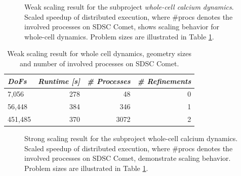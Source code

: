 \begin{figure}[H]
\centering
{}
\caption{Weak scaling result for the subproject \emph{whole-cell calcium dynamics}. 
Scaled speedup of distributed execution, where \#procs denotes the involved 
processes on SDSC Comet, shows scaling behavior for whole-cell dynamics. Problem sizes are illustrated in Table \ref{tab:speedup_whole_cell}.}
\label{fig:scaled_speedup_whole_cell}
\end{figure}

\begin{center}
\begin{table}[H]
\centering
\begin{tabular}{lrrr} 
\toprule
\emph{DoFs} & \emph{Runtime [s]} & \emph{\# Processes} & \emph{\# Refinements}\\
\midrule 
7,056 & 278 & 48 & 0 \\
56,448 & 384 & 346 & 1 \\
451,485 & 370 & 3072 & 2 \\
\bottomrule
\end{tabular}
\caption{Weak scaling result for whole cell dynamics, geometry sizes and number of involved processes on SDSC Comet.}
\label{tab:speedup_whole_cell}
\end{table}
\end{center}

\begin{figure}[H]
\centering
{}
\caption{Strong scaling result for the subproject whole-cell calcium dynamics. Scaled speedup of distributed execution, where \#procs denotes the involved 
processes on SDSC Comet, demonstrate scaling behavior. Problem sizes are
illustrated in Table \ref{tab:speedup_whole_cell}.}
\label{fig:scaled_speedup_whole_cell_strong}
\end{figure}

